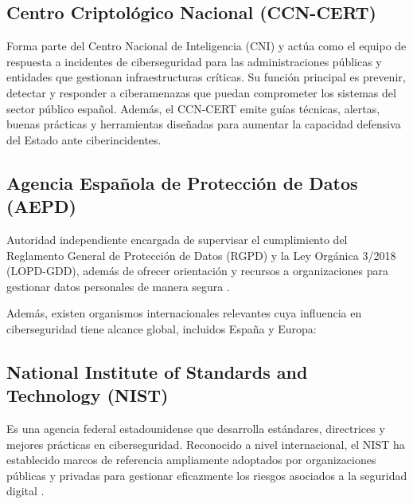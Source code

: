 \documentclass[a4paper, 10pt]{article}
\begin{document}
\subsection*{Centro Criptológico Nacional (CCN-CERT)}

Forma parte del Centro Nacional de Inteligencia (CNI) y actúa como el equipo de respuesta a incidentes de ciberseguridad para las administraciones públicas y entidades que gestionan infraestructuras críticas. Su función principal es prevenir, detectar y responder a ciberamenazas que puedan comprometer los sistemas del sector público español. Además, el CCN-CERT emite guías técnicas, alertas, buenas prácticas y herramientas diseñadas para aumentar la capacidad defensiva del Estado ante ciberincidentes. \cite{ccncert}



\par\vspace{0.5cm}

\subsection*{Agencia Española de Protección de Datos (AEPD)}

Autoridad independiente encargada de supervisar el cumplimiento del Reglamento General de Protección de Datos (RGPD) y la Ley Orgánica 3/2018 (LOPD-GDD), además de ofrecer orientación y recursos a organizaciones para gestionar datos personales de manera segura \cite{aepd}.
\par\vspace{0.5cm}

Además, existen organismos internacionales relevantes cuya influencia en ciberseguridad tiene alcance global, incluidos España y Europa:
\par\vspace{0.5cm}




\subsection*{National Institute of Standards and Technology (NIST)}

Es una agencia federal estadounidense que desarrolla estándares, directrices y mejores prácticas en ciberseguridad. Reconocido a nivel internacional, el NIST ha establecido marcos de referencia ampliamente adoptados por organizaciones públicas y privadas para gestionar eficazmente los riesgos asociados a la seguridad digital \cite{nist}.
\end{document}

